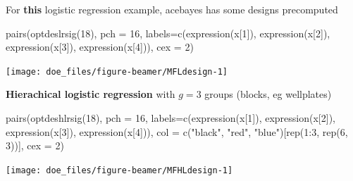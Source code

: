 \documentclass[
  ignorenonframetext,
]{beamer}
\newenvironment{Shaded}{\begin{snugshade}}{\end{snugshade}}
\newcommand{\AttributeTok}[1]{\textcolor[rgb]{0.77,0.63,0.00}{#1}}
\newcommand{\DecValTok}[1]{\textcolor[rgb]{0.00,0.00,0.81}{#1}}
\newcommand{\FunctionTok}[1]{\textcolor[rgb]{0.00,0.00,0.00}{#1}}
\newcommand{\NormalTok}[1]{#1}
\newcommand{\SpecialCharTok}[1]{\textcolor[rgb]{0.00,0.00,0.00}{#1}}
\newcommand{\StringTok}[1]{\textcolor[rgb]{0.31,0.60,0.02}{#1}}
\begin{document}
\begin{frame}[fragile]{}
\protect\hypertarget{section-35}{}
For \textbf{this} logistic regression example, acebayes has some designs
precomputed

\begin{Shaded}
\begin{Highlighting}[]
\FunctionTok{pairs}\NormalTok{(}\FunctionTok{optdeslrsig}\NormalTok{(}\DecValTok{18}\NormalTok{), }\AttributeTok{pch =} \DecValTok{16}\NormalTok{, }
      \AttributeTok{labels=}\FunctionTok{c}\NormalTok{(}\FunctionTok{expression}\NormalTok{(x[}\DecValTok{1}\NormalTok{]), }\FunctionTok{expression}\NormalTok{(x[}\DecValTok{2}\NormalTok{]), }\FunctionTok{expression}\NormalTok{(x[}\DecValTok{3}\NormalTok{]), }\FunctionTok{expression}\NormalTok{(x[}\DecValTok{4}\NormalTok{])), }\AttributeTok{cex =} \DecValTok{2}\NormalTok{)}
\end{Highlighting}
\end{Shaded}

\begin{center}\texttt{[image: doe\_files/figure-beamer/MFLdesign-1]} \end{center}
\end{frame}

\begin{frame}[fragile]{}
\protect\hypertarget{section-36}{}
\textbf{Hierachical logistic regression} with \(g=3\) groups (blocks, eg
wellplates)

\begin{Shaded}
\begin{Highlighting}[]
\FunctionTok{pairs}\NormalTok{(}\FunctionTok{optdeshlrsig}\NormalTok{(}\DecValTok{18}\NormalTok{), }\AttributeTok{pch =} \DecValTok{16}\NormalTok{, }
      \AttributeTok{labels=}\FunctionTok{c}\NormalTok{(}\FunctionTok{expression}\NormalTok{(x[}\DecValTok{1}\NormalTok{]), }\FunctionTok{expression}\NormalTok{(x[}\DecValTok{2}\NormalTok{]), }\FunctionTok{expression}\NormalTok{(x[}\DecValTok{3}\NormalTok{]), }\FunctionTok{expression}\NormalTok{(x[}\DecValTok{4}\NormalTok{])),}
      \AttributeTok{col =} \FunctionTok{c}\NormalTok{(}\StringTok{"black"}\NormalTok{, }\StringTok{"red"}\NormalTok{, }\StringTok{"blue"}\NormalTok{)[}\FunctionTok{rep}\NormalTok{(}\DecValTok{1}\SpecialCharTok{:}\DecValTok{3}\NormalTok{, }\FunctionTok{rep}\NormalTok{(}\DecValTok{6}\NormalTok{, }\DecValTok{3}\NormalTok{))], }\AttributeTok{cex =} \DecValTok{2}\NormalTok{)}
\end{Highlighting}
\end{Shaded}

\begin{center}\texttt{[image: doe\_files/figure-beamer/MFHLdesign-1]} \end{center}
\end{frame}
\end{document}
